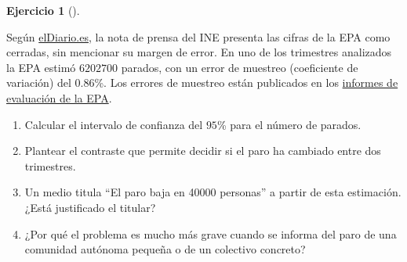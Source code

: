 \documentclass[
  spanish,
  a4paper,
]{scrreport}
\theoremstyle{definition}
\newtheorem{exercise}{Ejercicio}[chapter]
\theoremstyle{remark}
\begin{document}
\begin{exercise}[]\protect\hypertarget{exr-interpretacion-paro-epa}{}\label{exr-interpretacion-paro-epa}

Según
\href{https://www.eldiario.es/economia/rumano-hombre-depende-suba-espana_1_5739925.amp.html}{elDiario.es},
la nota de prensa del INE presenta las cifras de la EPA como cerradas,
sin mencionar su margen de error. En uno de los trimestres analizados la
EPA estimó \(6202700\) parados, con un error de muestreo (coeficiente de
variación) del \(0.86\)\%. Los errores de muestreo están publicados en
los
\href{https://ine.es/docutrab/eval_epa/evaluacion_epa19.pdf}{informes de
evaluación de la EPA}.

\begin{enumerate}
\def\labelenumi{\alph{enumi}.}
\item
  Calcular el intervalo de confianza del \(95\)\% para el número de
  parados.
\item
  Plantear el contraste que permite decidir si el paro ha cambiado entre
  dos trimestres.
\item
  Un medio titula ``El paro baja en 40000 personas'' a partir de esta
  estimación. ¿Está justificado el titular?
\item
  ¿Por qué el problema es mucho más grave cuando se informa del paro de
  una comunidad autónoma pequeña o de un colectivo concreto?
\end{enumerate}

\end{exercise}
\end{document}
